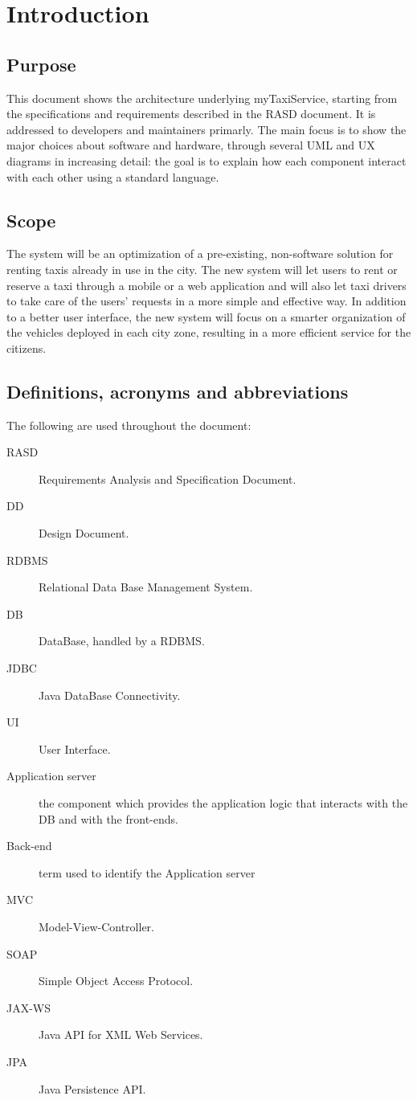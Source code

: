 \section{Introduction}

\subsection{Purpose}
This document shows the architecture underlying myTaxiService, starting from the specifications and requirements described in the RASD document. It is addressed to developers and maintainers primarly. The main focus is to show the major choices about software and hardware, through several UML and UX diagrams in increasing detail: the goal is to explain how each component interact with each other using a standard language.

\subsection{Scope}
The system will be an optimization of a pre-existing, non-software solution for renting taxis already in use in the city. The new system will let users to rent or reserve a taxi through a mobile or a web application and will also let taxi drivers to take care of the users' requests in a more simple and effective way. In addition to a better user interface, the new system will focus on a smarter organization of the vehicles deployed in each city zone, resulting in a more efficient service for the citizens.

\subsection{Definitions, acronyms and abbreviations}
The following are used throughout the document:
\begin{description}
\item[RASD] Requirements Analysis and Specification Document.
\item[DD] Design Document.
\item[RDBMS] Relational Data Base Management System.
\item[DB] DataBase, handled by a RDBMS.
\item[JDBC] Java DataBase Connectivity.
\item[UI] User Interface.
\item[Application server] the component which provides the application logic that interacts with the DB and with the front-ends.
\item[Back-end] term used to identify the Application server
\item[MVC] Model-View-Controller.
\item[SOAP] Simple Object Access Protocol.
\item[JAX-WS] Java API for XML Web Services.
\item[JPA] Java Persistence API.
\end{description}